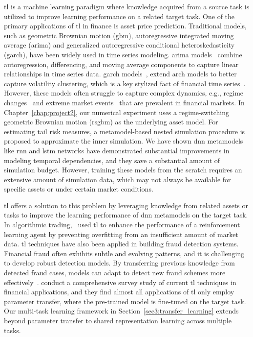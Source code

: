 \gls{tl} is a machine learning paradigm where knowledge acquired from a source task is utilized to improve learning performance on a related target task.
One of the primary applications of \gls{tl} in finance is asset price prediction. 
Traditional models, such as geometric Brownian motion (\gls{gbm}), autoregressive integrated moving average (\gls{arima}) and generalized autoregressive conditional heteroskedasticity (\gls{garch}), have been widely used in time series modeling.
\gls{arima} models~\citep{box1970distribution} combine autoregression, differencing, and moving average components to capture linear relationships in time series data.
\gls{garch} models~\citep{bollerslev1990modelling}, extend \gls{arch} models to better capture volatility clustering, which is a key stylized fact of financial time series~\citep{cont2001empirical}.
However, these models often struggle to capture complex dynamics, e.g., regime changes~\citep{hamilton1989new} and extreme market events~\citep{embrechts2013modelling} that are prevalent in financial markets.
In Chapter~\ref{chap:project2}, our numerical experiment uses a regime-switching geometric Brownian motion (\gls{rsgbm}) as the underlying asset model.
For estimating tail risk measures, a metamodel-based nested simulation procedure is proposed to approximate the inner simulation.
We have shown \gls{dnn} metamodels like \gls{rnn} and \gls{lstm} networks have demonstrated substantial improvements in modeling temporal dependencies, and they save a substantial amount of simulation budget.
However, training these models from the scratch requires an extensive amount of simulation data, which may not always be available for specific assets or under certain market conditions.

\gls{tl} offers a solution to this problem by leveraging knowledge from related assets or tasks to improve the learning performance of \gls{dnn} metamodels on the target task.
In algorithmic trading,~\cite{jeong2019improving} used \gls{tl} to enhance the performance of a reinforcement learning agent by preventing overfitting from an insufficient amount of market data.
\gls{tl} techniques have also been applied in building fraud detection systems. 
Financial fraud often exhibits subtle and evolving patterns, and it is challenging to develop robust detection models.
By transferring previous knowledge from detected fraud cases, models can adapt to detect new fraud schemes more effectively~\citep{lebichot2021transfer}.
\cite{yan2024comprehensive} conduct a comprehensive survey study of current \gls{tl} techniques in financial applications, and they find almost all applications of \gls{tl} only employ parameter transfer, where the pre-trained model is fine-tuned on the target task.
Our multi-task learning framework in Section~\ref{sec3:transfer_learning} extends beyond parameter transfer to shared representation learning across multiple tasks.

